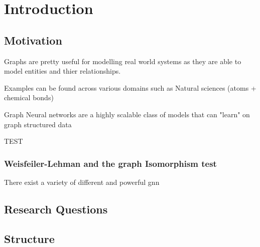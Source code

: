 % 

\chapter{Introduction}
\label{sec:intro}

\section{Motivation}
Graphs are pretty useful for modelling real world systems as they are able to model entities and thier
relationships.

Examples can be found across various domains such as
Natural sciences (atoms + chemical bonds)

Graph Neural networks are a highly scalable class of models that can
"learn" on graph structured data

TEST

\subsection{Weisfeiler-Lehman and the graph Isomorphism test}
There exist a variety of different and powerful \ac{gnn}
\section{Research Questions}
\section{Structure}